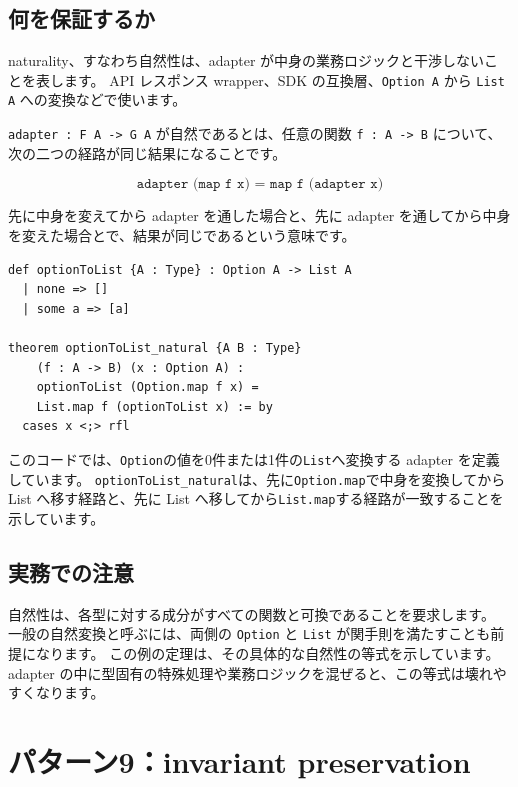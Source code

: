 \subsection{何を保証するか}

naturality、すなわち自然性は、adapter が中身の業務ロジックと干渉しないことを表します。
API レスポンス wrapper、SDK の互換層、\texttt{Option A} から \texttt{List A} への変換などで使います。

\texttt{adapter : F A -> G A} が自然であるとは、任意の関数 \texttt{f : A -> B} について、次の二つの経路が同じ結果になることです。

\[
\texttt{adapter (map f x) = map f (adapter x)}
\]

先に中身を変えてから adapter を通した場合と、先に adapter を通してから中身を変えた場合とで、結果が同じであるという意味です。

\begin{listing}[htbp]
\begin{verbatim}
def optionToList {A : Type} : Option A -> List A
  | none => []
  | some a => [a]

theorem optionToList_natural {A B : Type}
    (f : A -> B) (x : Option A) :
    optionToList (Option.map f x) =
    List.map f (optionToList x) := by
  cases x <;> rfl
\end{verbatim}
\caption{\texttt{optionToList\_natural}}
\label{lst:appc_naturality}
\end{listing}

このコードでは、\texttt{Option}の値を0件または1件の\texttt{List}へ変換する adapter を定義しています。
\texttt{optionToList\_natural}は、先に\texttt{Option.map}で中身を変換してから List へ移す経路と、先に List へ移してから\texttt{List.map}する経路が一致することを示しています。

\subsection{実務での注意}

自然性は、各型に対する成分がすべての関数と可換であることを要求します。
一般の自然変換と呼ぶには、両側の \texttt{Option} と \texttt{List} が関手則を満たすことも前提になります。
この例の定理は、その具体的な自然性の等式を示しています。
adapter の中に型固有の特殊処理や業務ロジックを混ぜると、この等式は壊れやすくなります。

\section{パターン9：invariant preservation}

